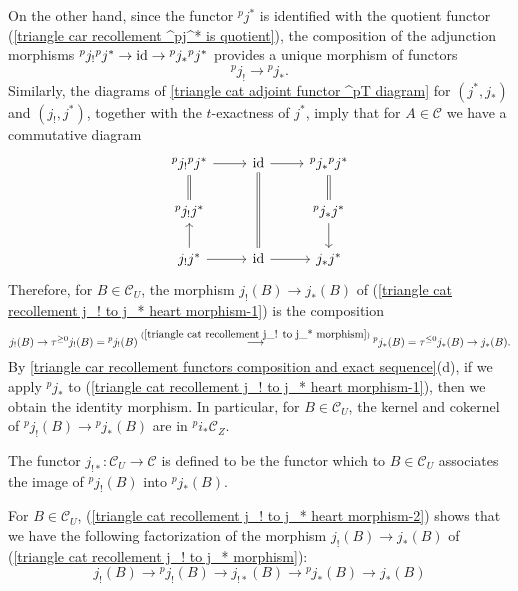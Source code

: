 On the other hand, since the functor ${^pj^*}$ is identified with the quotient functor (\cref{triangle car recollement ^pj^* is quotient}), the composition of the adjunction morphisms ${^pj_!}{^pj^*}\to\operatorname{id}\to{^pj_*}{^pj^*}$ provides a unique morphism of functors
\begin{equation}\label{triangle cat recollement j_! to j_* heart morphism-1}
{^pj_!}\to{^pj_*}.
\end{equation}
Similarly, the diagrams of \cref{triangle cat adjoint functor ^pT diagram} for $(j^*,j_*)$ and $(j_!,j^*)$, together with the $t$-exactness of $j^*$, imply that for $A\in\mathcal{C}$ we have a commutative diagram
\[\begin{tikzcd}
{^pj_!}{^pj^*}\ar[r]\ar[d,equal]&\id\ar[dd,equal]\ar[r]&{^pj_*}{^pj^*}\ar[d,equal]\\
{^pj_!}j^*&&{^pj_*}j^*\ar[d]\\
j_!j^*\ar[r]\ar[u]&\id\ar[r]&j_*j^*
\end{tikzcd}\]
Therefore, for $B\in\mathcal{C}_U$, the morphism $j_!(B)\to j_*(B)$ of (\ref{triangle cat recollement j_! to j_* heart morphism-1}) is the composition
\begin{equation}\label{triangle cat recollement j_! to j_* heart morphism-2}
j_!(B)\to \tau^{\geq 0}j_!(B)={^pj_!}(B)\stackrel{(\ref{triangle cat recollement j_! to j_* morphism})}{\longrightarrow}{^pj_*}(B)=\tau^{\leq 0}j_*(B)\to j_*(B).
\end{equation}
By \cref{triangle car recollement functors composition and exact sequence}(d), if we apply ${^pj_*}$ to (\ref{triangle cat recollement j_! to j_* heart morphism-1}), then we obtain the identity morphism. In particular, for $B\in\mathcal{C}_U$, the kernel and cokernel of ${^pj_!}(B)\to {^pj_*}(B)$ are in ${^pi_*}\mathcal{C}_Z$.

\begin{definition}
The functor $j_{!*}:\mathcal{C}_U\to\mathcal{C}$ is defined to be the functor which to $B\in\mathcal{C}_U$ associates the image of ${^pj_!}(B)$ into ${^pj_*}(B)$.
\end{definition}

For $B\in\mathcal{C}_U$, (\ref{triangle cat recollement j_! to j_* heart morphism-2}) shows that we have the following factorization of the morphism $j_!(B)\to j_*(B)$ of (\ref{triangle cat recollement j_! to j_* morphism}):
\begin{equation}\label{triangle cat recollement j_! to j_* heart morphism-3}
j_!(B)\to {^pj_!}(B)\to j_{!*}(B)\to {^pj_*}(B)\to j_*(B)
\end{equation}

